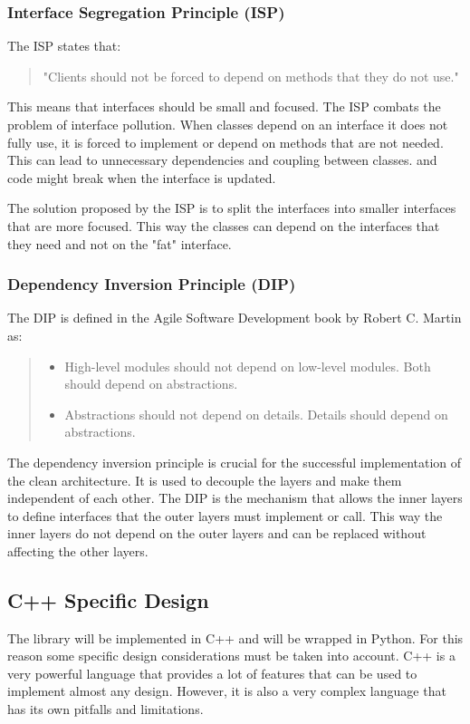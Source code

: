 \begin{spacing}{1.2}
    \subsubsection{Interface Segregation Principle (ISP)}
    The ISP states that:
    \begin{quote}
        "Clients should not be forced to depend on methods that they do not use." \cite{agileMartin}
    \end{quote}

    This means that interfaces should be small and focused.  The ISP combats the problem of interface pollution. When classes
    depend on an interface it does not fully use, it is forced to implement or depend on methods
    that are not needed. This can lead to unnecessary dependencies and coupling between classes.
    and code might break when the interface is updated.

    The solution proposed by the ISP is to split the interfaces into smaller interfaces that are
    more focused. This way the classes can depend on the interfaces that they need and not on the
    "fat" interface.

    \subsubsection{Dependency Inversion Principle (DIP)}
    The DIP is defined in the Agile Software Development book by Robert C. Martin \cite{agileMartin} as:
    \begin{quote}
        \begin{itemize}
            \item High-level modules should not depend on low-level modules. Both should depend on abstractions.
            \item Abstractions should not depend on details. Details should depend on abstractions.
        \end{itemize}
    \end{quote}

    The dependency inversion principle is crucial for the successful implementation of the clean architecture.
    It is used to decouple the layers and make them independent of each other. The DIP is the mechanism
    that allows the inner layers to define interfaces that the outer layers must implement or call.
    This way the inner layers do not depend on the outer layers and can be replaced without affecting the other layers.

    \subsection{C++ Specific Design}
    The library will be implemented in C++ and will be wrapped in Python. For this reason
    some specific design considerations must be taken into account. C++ is a very powerful
    language that provides a lot of features that can be used to implement almost any design.
    However, it is also a very complex language that has its own pitfalls and limitations.


\end{spacing}
